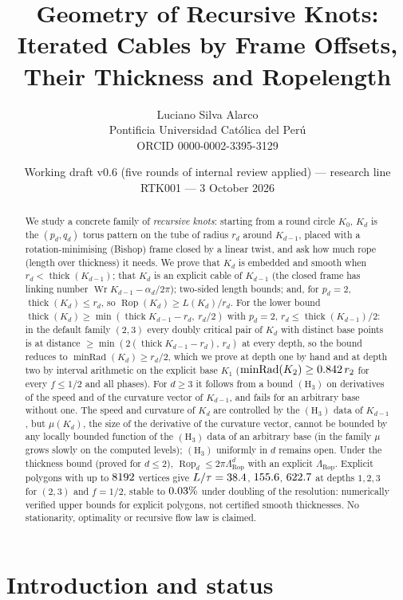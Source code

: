 \documentclass[10pt,a4paper]{article}
\title{\textbf{Geometry of Recursive Knots:}\\[2pt]
\large Iterated Cables by Frame Offsets, Their Thickness and Ropelength}
\author{Luciano Silva Alarco\\
\small Pontificia Universidad Cat\'olica del Per\'u\\
\small ORCID 0000-0002-3395-3129}
\date{\small Working draft v0.6 (five rounds of internal review applied) --- research line RTK001 --- 3 October 2026}
\theoremstyle{plain}
\theoremstyle{definition}
\theoremstyle{remark}
\newcommand{\thick}{\operatorname{thick}}
\newcommand{\Rop}{\operatorname{Rop}}
\newcommand{\Wr}{\operatorname{Wr}}
\newcommand{\minRad}{\operatorname{minRad}}
\begin{document}
\maketitle

\begin{abstract}
We study a concrete family of \emph{recursive knots}: starting from a round circle $K_0$, $K_d$ is the $(p_d,q_d)$ torus pattern on the tube of radius $r_d$ around $K_{d-1}$, placed with a rotation-minimising (Bishop) frame closed by a linear twist, and ask how much rope (length over thickness) it needs. We prove that $K_d$ is embedded and smooth when $r_d<\thick(K_{d-1})$; that $K_d$ is an explicit cable of $K_{d-1}$ (the closed frame has linking number $\Wr K_{d-1}-\alpha_d/2\pi$); two-sided length bounds; and, for $p_d=2$, $\thick(K_d)\le r_d$, so $\Rop(K_d)\ge L(K_d)/r_d$. For the lower bound $\thick(K_d)\ge\min(\thick K_{d-1}-r_d,\ r_d/2)$ with $p_d=2$, $r_d\le\thick(K_{d-1})/2$: in the default family $(2,3)$ every doubly critical pair of $K_d$ with distinct base points is at distance $\ge\min(2(\thick K_{d-1}-r_d),\,r_d)$ at every depth, so the bound reduces to $\minRad(K_d)\ge r_d/2$, which we prove at depth one by hand and at depth two by interval arithmetic on the explicit base $K_1$ ($\minRad(K_2)\ge\DtwoCertMinRad\,r_2$ for every $f\le1/2$ and all phases). For $d\ge3$ it follows from a bound $(\mathrm H_3)$ on derivatives of the speed and of the curvature vector of $K_{d-1}$, and fails for an arbitrary base without one. The speed and curvature of $K_d$ are controlled by the $(\mathrm H_3)$ data of $K_{d-1}$, but $\mu(K_d)$, the size of the derivative of the curvature vector, cannot be bounded by any locally bounded function of the $(\mathrm H_3)$ data of an arbitrary base (in the family $\mu$ grows slowly on the computed levels); $(\mathrm H_3)$ uniformly in $d$ remains open. Under the thickness bound (proved for $d\le2$), $\Rop_d\le2\pi\Lambda_{\Rop}^d$ with an explicit $\Lambda_{\Rop}$. Explicit polygons with up to $8192$ vertices give $L/\tau=38.4$, $155.6$, $622.7$ at depths $1,2,3$ for $(2,3)$ and $f=1/2$, stable to $0.03\%$ under doubling of the resolution: numerically verified upper bounds for explicit polygons, not certified smooth thicknesses. No stationarity, optimality or recursive flow law is claimed.
\end{abstract}

\section{Introduction and status}
\end{document}
